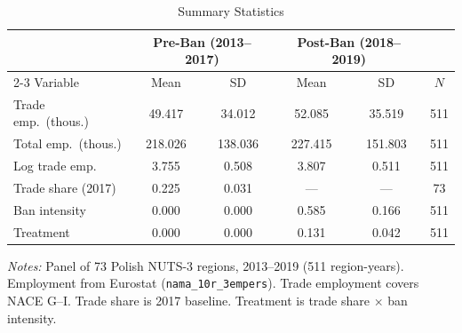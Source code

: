 \begin{table}[htbp]
\centering
\caption{Summary Statistics}
\label{tab:summary}
\small
\begin{tabular}{lccccc}
\hline\hline
 & \multicolumn{2}{c}{Pre-Ban (2013--2017)} & \multicolumn{2}{c}{Post-Ban (2018--2019)} & \\
\cline{2-3} \cline{4-5}
Variable & Mean & SD & Mean & SD & $N$ \\
\hline
Trade emp.\ (thous.) & 49.417 & 34.012 & 52.085 & 35.519 & 511 \\
Total emp.\ (thous.) & 218.026 & 138.036 & 227.415 & 151.803 & 511 \\
Log trade emp. & 3.755 & 0.508 & 3.807 & 0.511 & 511 \\
Trade share (2017) & 0.225 & 0.031 & --- & --- & 73 \\
Ban intensity & 0.000 & 0.000 & 0.585 & 0.166 & 511 \\
Treatment & 0.000 & 0.000 & 0.131 & 0.042 & 511 \\
\hline\hline
\end{tabular}
\begin{tablenotes}[flushleft]
\footnotesize
\item \textit{Notes:} Panel of 73 Polish NUTS-3 regions, 2013--2019
(511 region-years). Employment from Eurostat
(\texttt{nama\_10r\_3empers}). Trade employment covers NACE G--I.
Trade share is 2017 baseline. Treatment is trade share $\times$ ban intensity.
\end{tablenotes}
\end{table}
